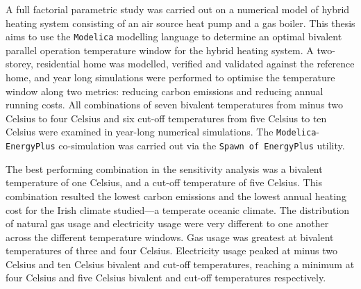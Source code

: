 

\begingroup
\let\clearpage\relax
\let\cleardoublepage\relax
\let\cleardoublepage\relax


A full factorial parametric study was carried out on a numerical model of hybrid heating system consisting of an air source heat pump and a gas boiler. This thesis aims to use the \texttt{Modelica} modelling language to determine an optimal bivalent parallel operation temperature window for the hybrid heating system. A two-storey, residential home was modelled, verified and validated against the reference home, and year long simulations were performed to optimise the temperature window along two metrics: reducing carbon emissions and reducing annual running costs. All combinations of seven bivalent temperatures from minus two Celsius to four Celsius and six cut-off temperatures from five Celsius to ten Celsius were examined in year-long numerical simulations. The \texttt{Modelica}-\texttt{EnergyPlus} co-simulation was carried out via the \texttt{Spawn of EnergyPlus} utility.

The best performing combination in the sensitivity analysis was a bivalent temperature of one Celsius, and  a cut-off temperature of five Celsius. This combination resulted the lowest carbon emissions and the lowest annual heating cost for the Irish climate studied---a temperate oceanic climate. The distribution of natural gas usage and electricity usage were very different to one another across the different temperature windows. Gas usage was greatest at bivalent temperatures of three and four Celsius. Electricity usage peaked at minus two Celsius and ten Celsius bivalent and cut-off temperatures, reaching a minimum at four Celsius and five Celsius bivalent and cut-off temperatures respectively. 

